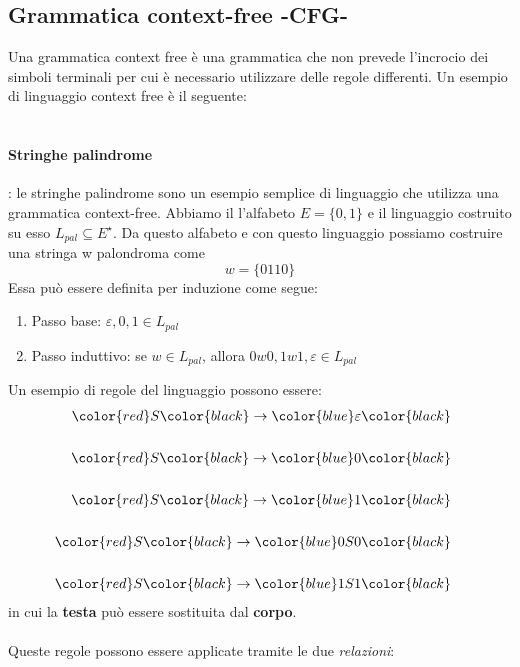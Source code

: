 \documentclass[11pt]{article}
\begin{document}
\subsection{Grammatica context-free -CFG-}
Una grammatica context free è una grammatica che non prevede l'incrocio dei simboli terminali per cui è necessario utilizzare delle regole differenti. Un esempio di linguaggio context free è il seguente:
\\ \\
\paragraph{Stringhe palindrome}: le stringhe palindrome sono un esempio semplice di linguaggio che utilizza una grammatica context-free.
Abbiamo il l'alfabeto $E = \{0,1\}$ e il linguaggio costruito su esso $L_{pal} \subseteq E^{\star}$. Da questo alfabeto e con questo linguaggio possiamo costruire una stringa w palondroma come $$w = \{0110\}$$
Essa può essere definita per induzione come segue:
\begin{enumerate}
\item Passo base: $\varepsilon , 0, 1 \in L_{pal}$
\item Passo induttivo: se $w \in L_{pal}$, allora $0w0, 1w1, \varepsilon \in L_{pal}$
\end{enumerate}
Un esempio di regole del linguaggio possono essere:
\begin{equation}
\begin{split}
\color{red}S \color{black} \rightarrow \color{blue}\varepsilon\color{black}\\&\\
\color{red}S \color{black} \rightarrow \color{blue}0 \color{black}\\&\\
\color{red}S \color{black} \rightarrow \color{blue}1 \color{black}\\&\\ 
\color{red}S \color{black} \rightarrow \color{blue}0S0 \color{black}\\&\\
\color{red}S \color{black} \rightarrow \color{blue}1S1\color{black}
\end{split}
\end{equation}
in cui la \color{red} \textbf{testa} \color{black} può essere sostituita dal \color{blue} \textbf{corpo}\color{black}.
\\ \\
Queste regole possono essere applicate tramite le due \emph{relazioni}:
\end{document}
